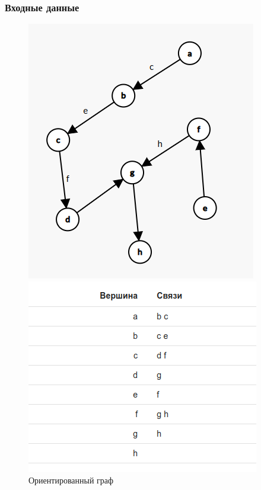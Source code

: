 \subsubsection{Входные данные}
\begin{figure}[H]
  \begin{minipage}{0.5\textwidth}
    \centering\includegraphics[width=\linewidth]{figs/task-2/graph-1.png}
  \end{minipage}
  \begin{minipage}{0.5\textwidth}
    \centering\includegraphics[width=\linewidth]{figs/task-2/adj-1.png}
  \end{minipage}
  \caption{Ориентированный граф}
\end{figure}

